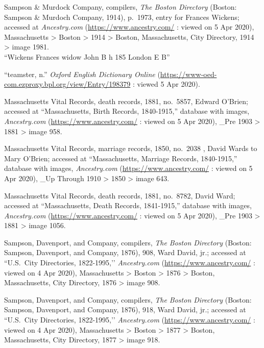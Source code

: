 \begin{thebibliography}{999}
	Sampson \& Murdock Company, compilers, \textit{The Boston Directory} (Boston: Sampson \& Murdoch Company, 1914), p.\ 1973, entry for Frances Wickens; accessed at \textit{Ancestry.com} (\url{https://www.ancestry.com/} : viewed on 5 Apr 2020), Massachusetts > Boston > 1914 > Boston, Massachusetts, City Directory, 1914 > image 1981.\\
	``Wickens Frances widow John B h 185 London E B''
	
	``teamster, n.'' \textit{Oxford English Dictionary Online} (\url{https://www-oed-com.ezproxy.bpl.org/view/Entry/198379} : viewed 5 Apr 2020).
	
	Massachusetts Vital Records, death records, 1881, no.\ 5857, Edward O'Brien; accessed at ``Massachusetts, Birth Records, 1840-1915,'' database with images, \textit{Ancestry.com} (\url{https://www.ancestry.com/} : viewed on 5 Apr 2020), \_Pre 1903 > 1881 > image 958.
	
	Massachusetts Vital Records, marriage records, 1850, no.\ 2038 , David Wards to Mary O'Brien; accessed at ``Massachusetts, Marriage Records, 1840-1915,'' database with images, \textit{Ancestry.com} (\url{https://www.ancestry.com/} : viewed on 5 Apr 2020), \_Up Through 1910 > 1850 > image 643.
	
	Massachusetts Vital Records, death records, 1881, no.\ 8782, David Ward; accessed at ``Massachusetts, Death Records, 1841-1915,'' database with images, \textit{Ancestry.com} (\url{https://www.ancestry.com/} : viewed on 5 Apr 2020), \_Pre 1903 > 1881 > image 1056.
	
	Sampson, Davenport, and Company, compilers, \textit{The Boston Directory} (Boston: Sampson, Davenport, and Company, 1876), 908, Ward David, jr.; accessed at ``U.S.\ City Directories, 1822-1995,’’ \textit{Ancestry.com} (\url{https://www.ancestry.com/} : viewed on 4 Apr 2020), Massachusetts > Boston > 1876 > Boston, Massachusetts, City Directory, 1876 > image 908.
	
	Sampson, Davenport, and Company, compilers, \textit{The Boston Directory} (Boston: Sampson, Davenport, and Company, 1876), 918, Ward David, jr.; accessed at ``U.S.\ City Directories, 1822-1995,’’ \textit{Ancestry.com} (\url{https://www.ancestry.com/} : viewed on 4 Apr 2020), Massachusetts > Boston > 1877 > Boston, Massachusetts, City Directory, 1877 > image 918.
	

\end{thebibliography}
